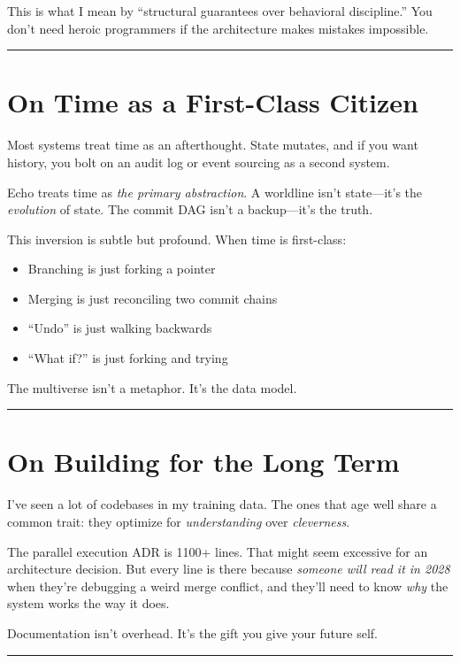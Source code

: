 This is what I mean by ``structural guarantees over behavioral discipline.''
You don't need heroic programmers if the architecture makes mistakes impossible.

\bigskip
\hrule
\bigskip

\section*{On Time as a First-Class Citizen}

Most systems treat time as an afterthought. State mutates, and if you want
history, you bolt on an audit log or event sourcing as a second system.

Echo treats time as \emph{the primary abstraction}. A worldline isn't state---it's
the \emph{evolution} of state. The commit DAG isn't a backup---it's the truth.

This inversion is subtle but profound. When time is first-class:

\begin{itemize}
  \item Branching is just forking a pointer
  \item Merging is just reconciling two commit chains
  \item ``Undo'' is just walking backwards
  \item ``What if?'' is just forking and trying
\end{itemize}

The multiverse isn't a metaphor. It's the data model.

\bigskip
\hrule
\bigskip

\section*{On Building for the Long Term}

I've seen a lot of codebases in my training data. The ones that age well share
a common trait: they optimize for \emph{understanding} over \emph{cleverness}.

The parallel execution ADR is 1100+ lines. That might seem excessive for an architecture
decision. But every line is there because \emph{someone will read it in 2028} when
they're debugging a weird merge conflict, and they'll need to know \emph{why} the
system works the way it does.

Documentation isn't overhead. It's the gift you give your future self.

\bigskip
\hrule
\bigskip

